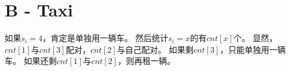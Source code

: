 \section{B - Taxi}
如果$s_i=4$，肯定是单独用一辆车。
然后统计$s_i=x$的有$cnt[x]$个。
显然，$cnt[1]$与$cnt[3]$配对，$cnt[2]$与自己配对。
如果剩$cnt[3]$，只能单独用一辆车。
如果还剩$cnt[1]$与$cnt[2]$，则再租一辆。
